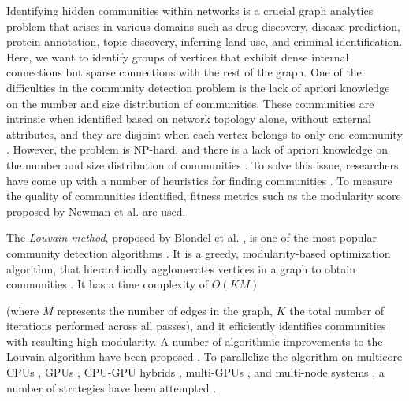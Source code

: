 Identifying hidden communities within networks is a crucial graph analytics problem that arises in various domains such as drug discovery, disease prediction, protein annotation, topic discovery, inferring land use, and criminal identification. Here, we want to identify groups of vertices that exhibit dense internal connections but sparse connections with the rest of the graph. One of the difficulties in the community detection problem is the lack of apriori knowledge on the number and size distribution of communities. These communities are intrinsic when identified based on network topology alone, without external attributes, and they are disjoint when each vertex belongs to only one community \cite{com-gregory10}. However, the problem is NP-hard, and there is a lack of apriori knowledge on the number and size distribution of communities \cite{com-blondel08}. To solve this issue, researchers have come up with a number of heuristics for finding communities \cite{com-guimera05, com-derenyi05, com-newman06, com-reichardt06, com-raghavan07, com-blondel08, com-rosvall08, infomap-rosvall09, com-fortunato10, com-gregory10, com-kloster14, com-come15, com-ruan15, com-newman16, com-ghoshal19, com-rita20, com-lu20, com-gupta22}. To measure the quality of communities identified, fitness metrics such as the modularity score proposed by Newman et al. \cite{com-newman06} are used.

The \textit{Louvain method}, proposed by Blondel et al. \cite{com-blondel08}, is one of the most popular community detection algorithms \cite{com-lancichinetti09}. It is a greedy, modularity-based optimization algorithm, that hierarchically agglomerates vertices in a graph to obtain communities \cite{com-blondel08}. It has a time complexity of $O(KM)$ (where $M$ represents the number of edges in the graph, $K$ the total number of iterations performed across all passes), and it efficiently identifies communities with resulting high modularity. A number of algorithmic improvements to the Louvain algorithm have been proposed \cite{com-rotta11, com-waltman13, com-gach14, com-ryu16, com-ozaki16, com-traag15, com-lu15, com-naim17, com-halappanavar17, com-ghosh18, com-traag19, com-shi21, com-zhang21, com-you22, com-aldabobi22}. To parallelize the algorithm on multicore CPUs \cite{staudt2015engineering, staudt2016networkit, com-fazlali17, com-halappanavar17, qie2022isolate}, GPUs \cite{com-naim17}, CPU-GPU hybrids \cite{com-bhowmik19, com-mohammadi20}, multi-GPUs \cite{com-cheong13, hricik2020using, chou2022batched, com-gawande22}, and multi-node systems \cite{com-ghosh18, ghosh2018scalable, sattar2022scalable, com-bhowmick22}, a number of strategies have been attempted \cite{com-cheong13, com-wickramaarachchi14, com-zeng15, com-que15, com-fazlali17, com-naim17, com-halappanavar17, com-ghosh18, com-bhowmik19, com-mohammadi20, com-shi21, com-bhowmick22}.

